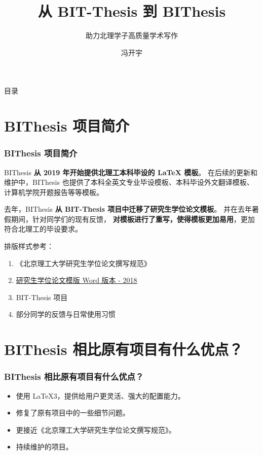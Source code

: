 \documentclass[
  aspectratio=169,
  presentation,
  titlegraphic=./images/bit.png,
  framelogo=./images/bit.png
]{bitbeamer}
\title{从 BIT-Thesis 到 BIThesis}
\subtitle{助力北理学子高质量学术写作}
\author{冯开宇}
\institute{北京理工大学}
\date{\zhdate{2023/02/22}}
\begin{document}
\frame{\titlepage}

%
%
\begin{frame}{目录}
  \tableofcontents[hideallsubsections]
\end{frame}


\section{BIThesis 项目简介}

\begin{frame}[t]
  \frametitle{BIThesis 项目简介}
  BIThesis \textbf{从 2019 年开始提供北理工本科毕设的 LaTeX 模板}。
  在后续的更新和维护中，BIThesis 也提供了本科全英文专业毕设模板、本科毕设外文翻译模板、计算机学院开题报告等等模板。

  去年，BIThesis \textbf{从 BIT-Thesis 项目中迁移了研究生学位论文模板}。
  并在去年暑假期间，针对同学们的现有反馈，
  \textbf{对模板进行了重写，使得模板更加易用}，更加符合北理工的毕设要求。

  \vspace{0.5cm}

  排版样式参考：
  \begin{enumerate}
    \item 《北京理工大学研究生学位论文撰写规范》
    \item \href{https://grd.bit.edu.cn/xwgz/xwgz2/wjxz_xwgz/b119746.htm}{研究生学位论文模版 Word 版本 - 2018}
    \item BIT-Thesis 项目
    \item 部分同学的反馈与日常使用习惯
  \end{enumerate}
\end{frame}




%
\section{BIThesis 相比原有项目有什么优点？}    %

\begin{frame}[t] %
  \frametitle{BIThesis 相比原有项目有什么优点？}

  \begin{itemize}
    \item 使用 LaTeX3，提供给用户更灵活、强大的配置能力。
    \item 修复了原有项目中的一些细节问题。
    \item 更接近《北京理工大学研究生学位论文撰写规范》。
    \item 持续维护的项目。
  \end{itemize}
\end{frame}
\end{document}
